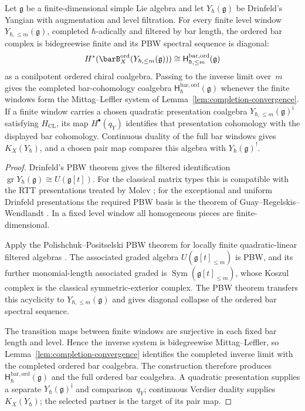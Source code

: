 \begin{proposition}\label{prop:yangian-koszul-general}
Let $\mathfrak g$ be a finite-dimensional simple Lie algebra and let
$Y_\hbar(\mathfrak g)$ be Drinfeld's Yangian with augmentation and level
filtration. For every finite level window $Y_{\hbar,\le m}(\mathfrak g)$,
completed $\hbar$-adically and filtered by bar length, the ordered bar
complex is bidegreewise finite and its PBW spectral sequence is diagonal:
\[
H^*(\barB_X^{\mathrm{ord}}(Y_{\hbar,\le m}(\mathfrak g)))
\cong \mathsf H^{\mathrm{bar,ord}}_{\hbar,\le m}(\mathfrak g)
\]
as a conilpotent ordered chiral coalgebra. Passing to the inverse limit
over~$m$ gives the completed bar-cohomology coalgebra
$\mathsf H^{\mathrm{bar,ord}}_\hbar(\mathfrak g)$ whenever the finite windows form the
Mittag--Leffler system of Lemma~\ref{lem:completion-convergence}.
If a finite window carries a chosen quadratic presentation coalgebra
$Y_{\hbar,\le m}(\mathfrak g)^{\mathrm i}$ satisfying
$H_{\mathrm{CL}}$, its map $H^\bullet(q_Y)$ identifies that
presentation cohomology with the displayed bar cohomology.  Continuous
duality of the full bar windows gives $K_X(Y_\hbar)$, and a chosen
pair map compares this algebra with $Y_\hbar(\mathfrak g)^!$.
\end{proposition}

\begin{proof}
Drinfeld's PBW theorem \cite{Drinfeld85} gives the filtered
identification
$\operatorname{gr}Y_\hbar(\mathfrak g)\cong U(\mathfrak g[t])$.
For the classical matrix types this is compatible with the RTT
presentations treated by Molev \cite{Molev07,molev-yangians}; for the
exceptional and uniform Drinfeld presentations the required PBW basis is
the theorem of Guay--Regelskis--Wendlandt \cite[Thm.~3.2]{GRW18}. In a
fixed level window all homogeneous pieces are finite-dimensional.

Apply the Polishchuk--Positselski PBW theorem for locally finite
quadratic-linear filtered algebras \cite[Ch.~4]{PP05}. The associated
graded algebra $U(\mathfrak g[t]_{\le m})$ is PBW, and its further
monomial-length associated graded is
$\operatorname{Sym}(\mathfrak g[t]_{\le m})$, whose Koszul complex is
the classical symmetric-exterior complex. The PBW theorem transfers this
acyclicity to $Y_{\hbar,\le m}(\mathfrak g)$ and gives diagonal collapse
of the ordered bar spectral sequence.

The transition maps between finite windows are surjective in each fixed
bar length and level. Hence the inverse system is bidegreewise
Mittag--Leffler, so Lemma~\ref{lem:completion-convergence} identifies
the completed inverse limit with the completed ordered bar coalgebra.
The construction therefore produces
$\mathsf H^{\mathrm{bar,ord}}_\hbar(\mathfrak g)$ and the full ordered
bar coalgebra.  A quadratic presentation supplies a separate
$Y_\hbar(\mathfrak g)^{\mathrm i}$ and comparison~$q_Y$; continuous
Verdier duality supplies $K_X(Y_\hbar)$; the selected partner is the
target of its pair map.
\end{proof}

